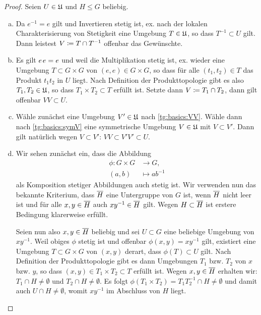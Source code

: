 \begin{proof}
    Seien $U\in\mathfrak{U}$ und $H\leq G$ beliebig.
    \begin{enumerate}[(a)]
        \item
            Da $e^{-1} = e$ gilt und Invertieren stetig ist, ex. nach der
            lokalen Charakterisierung von Stetigkeit eine Umgebung $T\in\mathfrak{U}$,
            so dass $T^{-1} \subset U$ gilt.
            Dann leistest $V \coloneqq T \cap T^{-1}$ offenbar das Gewünschte.
        
        \item
            Es gilt $e\mkern2mu e=e$ und weil die Multiplikation stetig ist, ex. wieder
            eine Umgebung $T\subset G\times G$ von $(e,e)\in G\times G$, so dass 
            für alle $(t_1,t_2)\in T$ das Produkt $t_1t_2$ in $U$ liegt.
            Nach Definition der Produkttopologie gibt es also
            $T_1,T_2\in\mathfrak{U}$, so dass $T_1\times T_2 \subset T$ erfüllt ist.
            Setzte dann $V\coloneqq T_1\cap T_2$, dann gilt offenbar $VV\subset U$.

        \item
            Wähle zunächst eine Umgebung $V'\in\mathfrak{U}$ nach
            \ref{tg:basics:VV}. Wähle dann nach \ref{tg:basics:symV} eine
            symmetrische Umgebung $V\in\mathfrak{U}$ mit $V\subset V'$. Dann gilt
            natürlich wegen $V\subset V'$: $VV \subset V'V' \subset U$.

        \item
            Wir sehen zunächst ein, dass die Abbildung
            \begin{align*}
                \phi\colon G\times G &\to G,    \\
                            (a,b)    &\mapsto ab^{-1}
            \end{align*}
            als Komposition stetiger Abbildungen auch stetig ist. Wir verwenden
            nun das bekannte Kriterium, dass $\overline{H}$ eine Untergruppe
            von $G$ ist, wenn $\overline{H}$ nicht leer ist und für alle
            $x,y\in\overline{H}$ auch $xy^{-1}\in\overline{H}$ gilt. Wegen
            $H\subset\overline{H}$ ist erstere Bedingung klarerweise erfüllt.
            
            Seien nun also $x,y \in \overline{H}$ beliebig und sei $U\subset G$
            eine beliebige Umgebung von $xy^{-1}$. Weil obiges $\phi$ stetig
            ist und offenbar $\phi(x,y)=xy^{-1}$ gilt, existiert eine Umgebung
            $T\subset G\times G$ von $(x,y)$ derart, dass $\phi(T) \subset U$ gilt. Nach
            Definition der Produkttopologie gibt es dann Umgebungen $T_1$ bzw.
            $T_2$ von $x$ bzw. $y$, so dass $(x,y) \in T_1\times T_2 \subset T$
            erfüllt ist. Wegen $x,y\in\overline{H}$ erhalten wir: 
            $T_1\cap H\neq\emptyset$ und $T_2\cap H\neq\emptyset$. Es folgt
            $\phi(T_1\times T_2)=T_1 T_2^{-1}\cap H\neq\emptyset$ und damit auch
            $U\cap H\neq\emptyset$, womit $xy^{-1}$ im Abschluss von $H$ liegt. 


\end{enumerate}
\end{proof}
